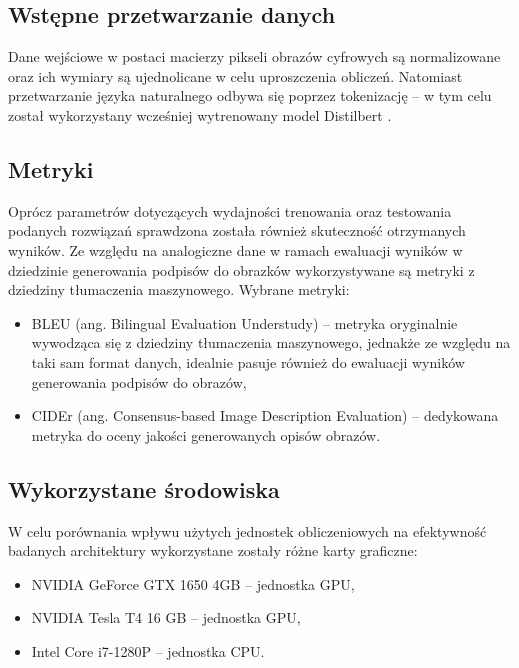 \subsection{Wstępne przetwarzanie danych}
Dane wejściowe w postaci macierzy pikseli obrazów cyfrowych są normalizowane oraz ich wymiary są ujednolicane w celu uproszczenia obliczeń. Natomiast przetwarzanie języka naturalnego odbywa się poprzez tokenizację -- w tym celu został wykorzystany wcześniej wytrenowany model Distilbert \cite{distilbert}.
\subsection{Metryki}
Oprócz parametrów dotyczących wydajności trenowania oraz testowania podanych rozwiązań sprawdzona została również skuteczność otrzymanych wyników. Ze względu na analogiczne dane w ramach ewaluacji wyników w dziedzinie generowania podpisów do obrazków wykorzystywane są metryki z dziedziny tłumaczenia maszynowego. Wybrane metryki:
\begin{itemize}
    \item BLEU (ang. Bilingual Evaluation Understudy) \cite{bleu} -- metryka oryginalnie wywodząca się z dziedziny tłumaczenia maszynowego, jednakże ze względu na taki sam format danych, idealnie pasuje również do ewaluacji wyników generowania podpisów do obrazów,
    \item CIDEr (ang. Consensus-based Image Description Evaluation) \cite{cider} -- dedykowana metryka do oceny jakości generowanych opisów obrazów.
\end{itemize}
\subsection{Wykorzystane środowiska}
W celu porównania wpływu użytych jednostek obliczeniowych na efektywność badanych architektury wykorzystane zostały różne karty graficzne:
\begin{itemize}
    \item NVIDIA GeForce GTX 1650 4GB -- jednostka GPU,
    \item NVIDIA Tesla T4 16 GB -- jednostka GPU,
    \item Intel Core i7-1280P -- jednostka CPU.
\end{itemize}
